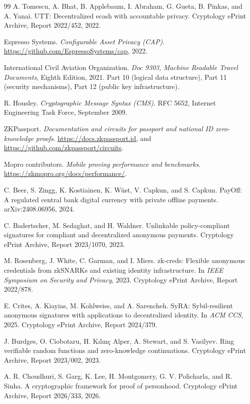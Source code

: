 \documentclass[11pt,a4paper]{article}
\theoremstyle{definition}
\theoremstyle{plain}
\theoremstyle{remark}
\begin{document}
\begin{thebibliography}{99}
A. Tomescu, A. Bhat, B. Applebaum, I. Abraham, G. Gueta, B. Pinkas, and A. Yanai. UTT: Decentralized ecash with accountable privacy. Cryptology ePrint Archive, Report 2022/452, 2022.

Espresso Systems. \emph{Configurable Asset Privacy (CAP)}. \url{https://github.com/EspressoSystems/cap}, 2022.

International Civil Aviation Organization. \emph{Doc 9303, Machine Readable Travel Documents}, Eighth Edition, 2021. Part 10 (logical data structure), Part 11 (security mechanisms), Part 12 (public key infrastructure).

R. Housley. \emph{Cryptographic Message Syntax (CMS)}. RFC 5652, Internet Engineering Task Force, September 2009.

ZKPassport. \emph{Documentation and circuits for passport and national ID zero-knowledge proofs}. \url{https://docs.zkpassport.id}, and \url{https://github.com/zkpassport/circuits}.

Mopro contributors. \emph{Mobile proving performance and benchmarks}. \url{https://zkmopro.org/docs/performance/}.

C. Beer, S. Zingg, K. Kostiainen, K. W\"ust, V. Capkun, and S. Capkun. PayOff: A regulated central bank digital currency with private offline payments. arXiv:2408.06956, 2024.

C. Badertscher, M. Sedaghat, and H. Waldner. Unlinkable policy-compliant signatures for compliant and decentralized anonymous payments. Cryptology ePrint Archive, Report 2023/1070, 2023.

M. Rosenberg, J. White, C. Garman, and I. Miers. zk-creds: Flexible anonymous credentials from zkSNARKs and existing identity infrastructure. In \emph{IEEE Symposium on Security and Privacy}, 2023. Cryptology ePrint Archive, Report 2022/878.

E. Crites, A. Kiayias, M. Kohlweiss, and A. Sarencheh. SyRA: Sybil-resilient anonymous signatures with applications to decentralized identity. In \emph{ACM CCS}, 2025. Cryptology ePrint Archive, Report 2024/379.

J. Burdges, O. Ciobotaru, H. K\i{}l\i{}n\c{c} Alper, A. Stewart, and S. Vasilyev. Ring verifiable random functions and zero-knowledge continuations. Cryptology ePrint Archive, Report 2023/002, 2023.

A. R. Choudhuri, S. Garg, K. Lee, H. Montgomery, G. V. Policharla, and R. Sinha. A cryptographic framework for proof of personhood. Cryptology ePrint Archive, Report 2026/333, 2026.


\end{thebibliography}
\end{document}
